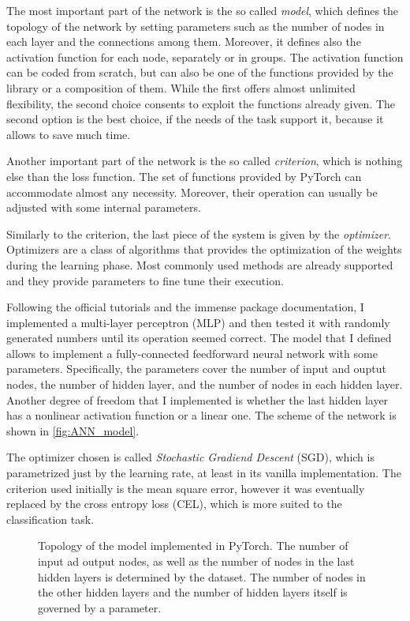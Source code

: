 The most important part of the network is the so called \textit{model}, which defines the topology of the network by setting parameters such as the number of nodes in each layer and the connections among them.
Moreover, it defines also the activation function for each node, separately or in groups.
The activation function can be coded from scratch, but can also be one of the functions provided by the library or a composition of them.
While the first offers almost unlimited flexibility, the second choice consents to exploit the functions already given.
The second option is the best choice, if the needs of the task support it, because it allows to save much time.

Another important part of the network is the so called \textit{criterion}, which is nothing else than the loss function.
The set of functions provided by PyTorch can accommodate almost any necessity.
Moreover, their operation can usually be adjusted with some internal parameters.

Similarly to the criterion, the last piece of the system is given by the \textit{optimizer}.
Optimizers are a class of algorithms that provides the optimization of the weights during the learning phase.
Most commonly used methods are already supported and they provide parameters to fine tune their execution.

Following the official tutorials and the immense package documentation, I implemented a multi-layer perceptron (MLP) and then tested it with randomly generated numbers until its operation seemed correct.
The model that I defined allows to implement a fully-connected feedforward neural network with some parameters.
Specifically, the parameters cover the number of input and ouptut nodes, the number of hidden layer, and the number of nodes in each hidden layer.
Another degree of freedom that I implemented is whether the last hidden layer has a nonlinear activation function or a linear one.
The scheme of the network is shown in \autoref{fig:ANN_model}.

The optimizer chosen is called \textit{Stochastic Gradiend Descent} (SGD), which is parametrized just by the learning rate, at least in its vanilla implementation.
The criterion used initially is the mean square error, however it was eventually replaced by the cross entropy loss (CEL), which is more suited to the classification task.

\begin{figure}[htbp]
	\centering
	
	\caption{Topology of the model implemented in PyTorch. The number of input ad output nodes, as well as the number of nodes in the last hidden layers is determined by the dataset.
	The number of nodes in the other hidden layers and the number of hidden layers itself is governed by a parameter.}
	\label{fig:ANN_model}
\end{figure}

